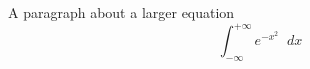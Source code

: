 \documentclass{article}
\newcommand{\diff}{\mathop{}\!d} %
\begin{document}
A paragraph about a larger equation
\[
\int_{-\infty}^{+\infty} e^{-x^2} \diff x
\]
\end{document}
